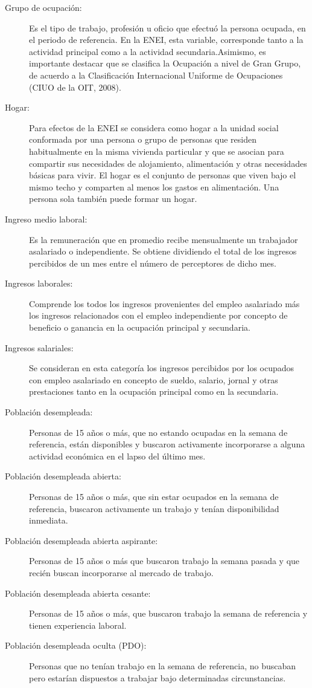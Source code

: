 \begin{description}
	\item[Grupo de ocupación:] Es el tipo de trabajo, profesión u oficio que efectuó la persona ocupada, en el periodo de referencia. En la ENEI, esta variable, corresponde tanto a la actividad principal como a la actividad secundaria.Asimismo, es importante destacar que se clasifica la Ocupación a nivel de Gran Grupo, de acuerdo a la Clasificación Internacional Uniforme de Ocupaciones (CIUO de la OIT, 2008).
	\item[Hogar:] Para efectos de la ENEI se considera como hogar a la unidad social conformada por una persona o grupo de personas que residen habitualmente en la misma vivienda particular y que se asocian para compartir sus necesidades de alojamiento, alimentación y otras necesidades básicas para vivir. El hogar es el conjunto de personas que viven bajo el mismo techo y comparten al menos los gastos en alimentación. Una persona sola también puede formar un hogar.
	\item[Ingreso medio laboral:] Es la remuneración que en promedio recibe mensualmente un trabajador asalariado o independiente. Se obtiene dividiendo el total de los ingresos percibidos de un mes entre el número de perceptores de dicho mes.
	\item[Ingresos laborales:] Comprende los todos los ingresos provenientes del empleo asalariado más los ingresos relacionados con el empleo independiente por concepto de beneficio o ganancia en la ocupación principal y secundaria.
	\item[Ingresos salariales:] Se consideran en esta categoría los ingresos percibidos por los ocupados con empleo asalariado en concepto de sueldo, salario, jornal y otras prestaciones tanto en la ocupación principal como en la secundaria.
	\item[Población desempleada:] Personas de 15 años o más, que no estando ocupadas en la semana de referencia, están disponibles y buscaron activamente incorporarse a alguna actividad económica en el lapso del último mes. 
	\item[Población desempleada abierta:] Personas de 15 años o más, que sin estar ocupados en la semana de referencia, buscaron activamente un trabajo y tenían disponibilidad inmediata.
	
	\item[Población desempleada abierta aspirante:] Personas de 15 años o más que buscaron trabajo la semana pasada y que recién buscan incorporarse al mercado de trabajo.
	
	\item[Población desempleada abierta cesante:] Personas de 15 años o más, que buscaron trabajo la semana de referencia y tienen experiencia laboral.
	\item[Población desempleada oculta (PDO):] Personas que no tenían trabajo en la semana de referencia, no buscaban pero estarían dispuestos a trabajar bajo determinadas circunstancias.
	

\end{description}
